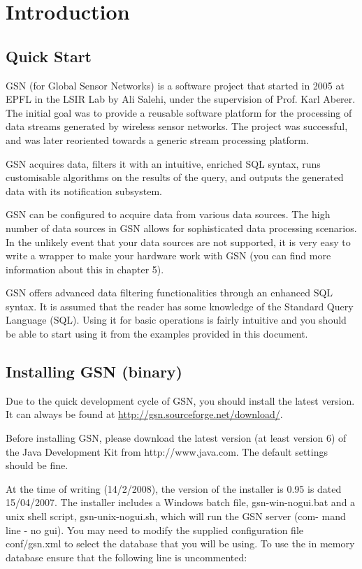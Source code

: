 \chapter{Introduction}

\section{Quick Start}

GSN (for Global Sensor Networks) is a software project that started in
2005 at EPFL in the LSIR Lab by Ali Salehi, under the supervision of
Prof. Karl Aberer. The initial goal was to provide a reusable software
platform for the processing of data streams generated by wireless
sensor networks. The project was successful, and was later reoriented
towards a generic stream processing platform.

GSN acquires data, filters it with an intuitive, enriched SQL syntax,
runs customisable algorithms on the results of the query, and outputs
the generated data with its notification subsystem.

GSN can be configured to acquire data from various data sources. The
high number of data sources in GSN allows for sophisticated data
processing scenarios. In the unlikely event that your data sources are
not supported, it is very easy to write a wrapper to make your hardware
work with GSN (you can find more information about this in chapter 5).

GSN offers advanced data filtering functionalities through an enhanced
SQL syntax. It is assumed that the reader has some knowledge of the
Standard Query Language (SQL). Using it for basic operations is fairly
intuitive and you should be able to start using it from the examples
provided in this document.

\section{Installing GSN (binary)}

Due to the quick development cycle of GSN, you should install the
latest version.  It can always be found at
\url{http://gsn.sourceforge.net/download/}.

Before installing GSN, please download the latest version (at least
version 6) of the Java Development Kit from http://www.java.com. The
default settings should be fine.

At the time of writing (14/2/2008), the version of the installer is
0.95 is dated 15/04/2007. The installer includes a Windows batch file,
gsn-win-nogui.bat and a unix shell script, gsn-unix-nogui.sh, which
will run the GSN server (com- mand line - no gui). You may need to
modify the supplied configuration file conf/gsn.xml to select the
database that you will be using. To use the in memory database ensure
that the following line is uncommented:

